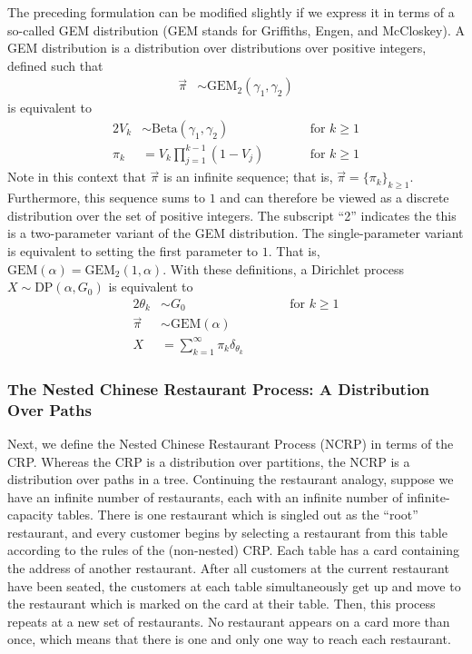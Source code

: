 \documentclass{article}
\begin{document}
The preceding formulation can be modified slightly if we express it in terms of a so-called GEM distribution (GEM stands for Griffiths, Engen, and McCloskey).
A GEM distribution is a distribution over distributions over positive integers, defined such that
\begin{align}
\vec \pi &\sim \text{GEM}_2(\gamma_1, \gamma_2)
\end{align}
is equivalent to
\begin{alignat}{2}
V_k &\sim \text{Beta}(\gamma_1, \gamma_2) &\qquad& \text{for $k \geq 1$} \\
\pi_k &= V_k \prod_{j=1}^{k-1} (1 - V_j) &\qquad& \text{for $k \geq 1$}
\end{alignat}
Note in this context that $\vec \pi$ is an infinite sequence; that is, $\vec \pi = \{ \pi_k \}_{k \geq 1}$.
Furthermore, this sequence sums to $1$ and can therefore be viewed as a discrete distribution over the set of positive integers.
The subscript ``2'' indicates the this is a two-parameter variant of the GEM distribution.
The single-parameter variant is equivalent to setting the first parameter to $1$.
That is, $\text{GEM}(\alpha) = \text{GEM}_2(1, \alpha)$.
With these definitions, a Dirichlet process $X \sim \text{DP}(\alpha, G_0)$ is equivalent to
\begin{alignat}{2}
\theta_k &\sim G_0 &\qquad& \text{for $k \geq 1$} \\
\vec \pi &\sim \text{GEM}(\alpha) && \\
X &= \sum_{k=1}^\infty \pi_k \delta_{\theta_k} &&
\end{alignat}

\subsubsection{The Nested Chinese Restaurant Process: A Distribution Over Paths}

Next, we define the Nested Chinese Restaurant Process (NCRP) in terms of the CRP.
Whereas the CRP is a distribution over partitions, the NCRP is a distribution over paths in a tree.
Continuing the restaurant analogy, suppose we have an infinite number of restaurants, each with an infinite number of infinite-capacity tables.
There is one restaurant which is singled out as the ``root'' restaurant, and every customer begins by selecting a restaurant from this table according to the rules of the (non-nested) CRP.
Each table has a card containing the address of another restaurant.
After all customers at the current restaurant have been seated, the customers at each table simultaneously get up and move to the restaurant which is marked on the card at their table.
Then, this process repeats at a new set of restaurants.
No restaurant appears on a card more than once, which means that there is one and only one way to reach each restaurant.
\end{document}
